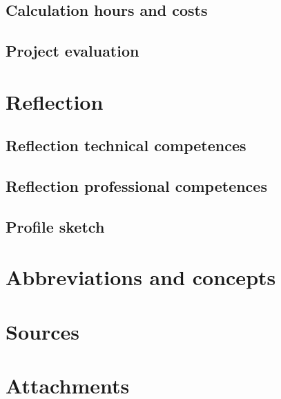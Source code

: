 \documentclass[12pt,a4paper]{report}
\begin{document}
\section{Calculation hours and costs}

\section{Project evaluation}

\chapter{Reflection}
\section{Reflection technical competences}

\section{Reflection professional competences}

\section{Profile sketch}

\chapter{Abbreviations and concepts}

\chapter{Sources}

\chapter{Attachments}



\end{document}
